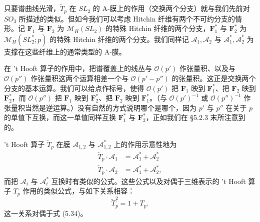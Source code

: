 
只要谱曲线光滑，$\widetilde{T}_p$ 在 $SL_2$ 的 A-膜上的作用（交换两个分支）就与我们先前对 $SO_3$ 所描述的类似。但如今我们可以考虑 Hitchin 纤维有两个不可约分支的情形。记 $\boldsymbol{F}_1$ 与 $\boldsymbol{F}_2$ 为 $\mathcal{M}_H(SL_2)$ 的特殊 Hitchin 纤维的两个分支，$\boldsymbol{F}_1^*$ 与 $\boldsymbol{F}_2^*$ 为 $\mathcal{M}_H(SL_2^*;p)$ 的特殊 Hitchin 纤维的两个分支。我们同样记 $\mathcal{A}_1,\mathcal{A}_2$ 与 $\mathcal{A}_1^*,\mathcal{A}_2^*$ 为支撑在这些纤维上的通常类型的 A-膜。

在 't Hooft 算子的作用中，把谱覆盖上的线丛与 $\mathcal{O}(p')$ 作张量积、以及与 $\mathcal{O}(p'')$ 作张量积这两个运算相差一个与 $\mathcal{O}(p'-p'')$ 的张量积。这正是交换两个分支的基本运算。我们可以给点作标号，使得 $\mathcal{O}(p')$ 把 $\boldsymbol{F}_1$ 映到 $\boldsymbol{F}_1^*$、把 $\boldsymbol{F}_2$ 映到 $\boldsymbol{F}_2^*$，而 $\mathcal{O}(p'')$ 把 $\boldsymbol{F}_1$ 映到 $\boldsymbol{F}_2^*$、把 $\boldsymbol{F}_2$ 映到 $\boldsymbol{F}_1^*$。（与 $\mathcal{O}(p')^{-1}$ 或 $\mathcal{O}(p'')^{-1}$ 作张量积当然是逆运算。）没有自然的方式说明哪个是哪个，因为 $p'$ 与 $p''$ 在关于 $p$ 的单值下互换，而这一单值同样互换 $\boldsymbol{F}_1^*$ 与 $\boldsymbol{F}_2^*$，正如我们在 §5.2.3 末所注意到的。

't Hooft 算子 $\widetilde{T}_p$ 在膜 $\mathcal{A}_{1,2}$ 与 $\mathcal{A}_{1,2}^*$ 上的作用示意性地为
\begin{equation}\tag{5.38}
\begin{aligned}
\widetilde{T}_p\cdot\mathcal{A}_1 &= \mathcal{A}_1^*+\mathcal{A}_2^*\\
\widetilde{T}_p\cdot\mathcal{A}_2 &= \mathcal{A}_1^*+\mathcal{A}_2^*,
\end{aligned}
\end{equation}
而把 $\mathcal{A}_i$ 与 $\mathcal{A}_i^*$ 互换时有类似的公式。这些公式以及对偶于三维表示的 't Hooft 算子 $T_p$ 作用的类似公式，与如下关系相容：
\begin{equation}\tag{5.39}
\widetilde{T}_p^2=1+T_p.
\end{equation}
这一关系对偶于式 (5.34)。

